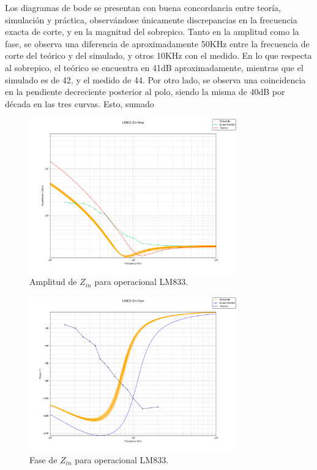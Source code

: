 Los diagramas de bode se presentan con buena concordancia entre teoría, simulación y práctica, observándose únicamente discrepancias en la frecuencia exacta de corte, y en la magnitud del sobrepico.
Tanto en la amplitud como la fase, se observa una diferencia de aproximadamente 50KHz entre la frecuencia de corte del teórico y del simulado, y otros 10KHz con el medido.
En lo que respecta al sobrepico, el teórico se encuentra en 41dB aproximadamente, mientras que el simulado es de 42, y el medido de 44.
Por otro lado, se observa una coincidencia en la pendiente decreciente posterior al polo, siendo la misma de 40dB por década en las tres curvas.
Esto, sumado 
\begin{figure}[H]
    \begin{minipage}{\textwidth}
        \centering
        \includegraphics[width=0.8\textwidth]{../EJ2/recursos_para_el_informe/LM833_Zin_Amp}
        \caption{Amplitud de $Z_{in}$ para operacional LM833.}
        \label{fig:LM833_Zin_Amp}
    \end{minipage}\hfill
\end{figure}
\begin{figure}[H]
    \begin{minipage}{\textwidth}
        \centering
        \includegraphics[width=0.8\textwidth]{../EJ2/recursos_para_el_informe/LM833_Zin_Fase}
        \caption{Fase de $Z_{in}$ para operacional LM833.}
        \label{fig:LM833_Zin_Fase}
    \end{minipage}\hfill
\end{figure}

